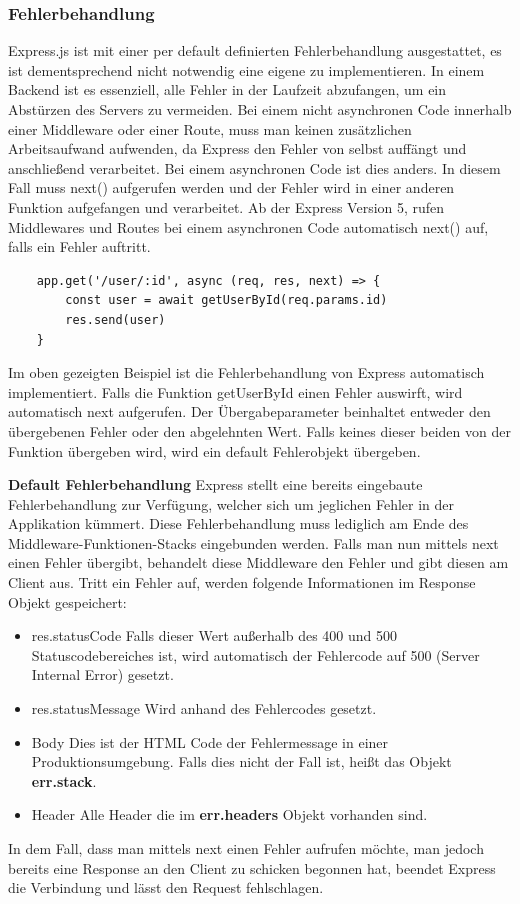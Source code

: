 \subsubsection{Fehlerbehandlung}
Express.js ist mit einer per default definierten Fehlerbehandlung ausgestattet, es ist dementsprechend nicht notwendig eine eigene zu implementieren. In einem Backend ist es essenziell, alle Fehler in der Laufzeit abzufangen, um ein Abstürzen des Servers zu vermeiden. Bei einem nicht asynchronen Code innerhalb einer Middleware oder einer Route, muss man keinen zusätzlichen Arbeitsaufwand aufwenden, da Express den Fehler von selbst auffängt und anschließend verarbeitet. Bei einem asynchronen Code ist dies anders. In diesem Fall muss next() aufgerufen werden und der Fehler wird in einer anderen Funktion aufgefangen und verarbeitet. Ab der Express Version 5, rufen Middlewares und Routes bei einem asynchronen Code automatisch next() auf, falls ein Fehler auftritt.
\begin{lstlisting}
    app.get('/user/:id', async (req, res, next) => {
        const user = await getUserById(req.params.id)
        res.send(user)
    }
\end{lstlisting}
Im oben gezeigten Beispiel ist die Fehlerbehandlung von Express automatisch implementiert. Falls die Funktion getUserById einen Fehler auswirft, wird automatisch next aufgerufen. Der Übergabeparameter beinhaltet entweder den übergebenen Fehler oder den abgelehnten Wert. Falls keines dieser beiden von der Funktion übergeben wird, wird ein default Fehlerobjekt übergeben.

\textbf{Default Fehlerbehandlung}
\newline
Express stellt eine bereits eingebaute Fehlerbehandlung zur Verfügung, welcher sich um jeglichen Fehler in der Applikation kümmert. Diese Fehlerbehandlung muss lediglich am Ende des Middleware-Funktionen-Stacks eingebunden werden. Falls man nun mittels next einen Fehler übergibt, behandelt diese Middleware den Fehler und gibt diesen am Client aus. Tritt ein Fehler auf, werden folgende Informationen im Response Objekt gespeichert:
\begin{itemize}
    \item res.statusCode
        \newline
        Falls dieser Wert außerhalb des 400 und 500 Statuscodebereiches ist, wird automatisch der Fehlercode auf 500 (Server Internal Error) gesetzt.
    \item res.statusMessage
        \newline
        Wird anhand des Fehlercodes gesetzt.
    \item Body
        \newline
        Dies ist der HTML Code der Fehlermessage in einer Produktionsumgebung. Falls dies nicht der Fall ist, heißt das Objekt \textbf{err.stack}.
    \item Header
        \newline
        Alle Header die im \textbf{err.headers} Objekt vorhanden sind.
\end{itemize}
In dem Fall, dass man mittels next einen Fehler aufrufen möchte, man jedoch bereits eine Response an den Client zu schicken begonnen hat, beendet Express die Verbindung und lässt den Request fehlschlagen.

